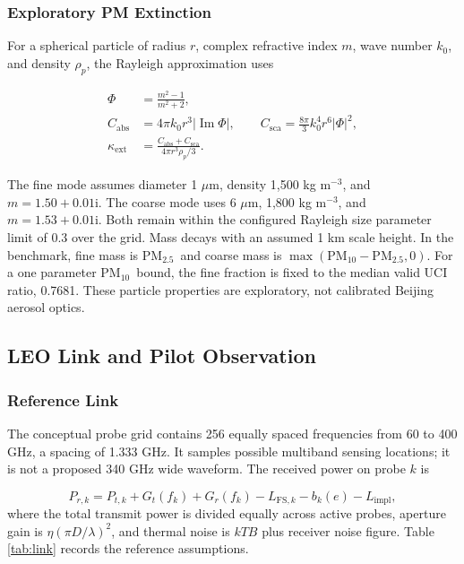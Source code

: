 \documentclass[conference]{IEEEtran}
\newcommand{\pmfive}{PM$_{2.5}$}
\newcommand{\pmten}{PM$_{10}$}
\begin{document}
\subsubsection{Exploratory PM Extinction}

For a spherical particle of radius $r$, complex refractive index $m$, wave number $k_0$, and density $\rho_p$, the Rayleigh approximation uses \cite{bohren1983}

\begin{align}
\Phi &= \frac{m^2-1}{m^2+2}, \\
C_{\mathrm{abs}} &=4\pi k_0 r^3|\operatorname{Im}\Phi|,\qquad
C_{\mathrm{sca}}=\frac{8\pi}{3}k_0^4r^6|\Phi|^2,\\
\kappa_{\mathrm{ext}}&=\frac{C_{\mathrm{abs}}+C_{\mathrm{sca}}}
{4\pi r^3\rho_p/3}.
\label{eq:pm}
\end{align}

The fine mode assumes diameter 1 $\mu$m, density 1,500 kg m$^{-3}$, and $m=1.50+0.01\mathrm{i}$. The coarse mode uses 6 $\mu$m, 1,800 kg m$^{-3}$, and $m=1.53+0.01\mathrm{i}$. Both remain within the configured Rayleigh size parameter limit of 0.3 over the grid. Mass decays with an assumed 1 km scale height. In the benchmark, fine mass is \pmfive\ and coarse mass is $\max(\mathrm{PM}_{10}-\mathrm{PM}_{2.5},0)$. For a one parameter \pmten\ bound, the fine fraction is fixed to the median valid UCI ratio, 0.7681. These particle properties are exploratory, not calibrated Beijing aerosol optics.

\subsection{LEO Link and Pilot Observation}

\subsubsection{Reference Link}

The conceptual probe grid contains 256 equally spaced frequencies from 60 to 400 GHz, a spacing of 1.333 GHz. It samples possible multiband sensing locations; it is not a proposed 340 GHz wide waveform. The received power on probe $k$ is

\begin{equation}
P_{r,k}=P_{t,k}+G_t(f_k)+G_r(f_k)-L_{\mathrm{FS},k}
-b_k(e)-L_{\mathrm{impl}},
\label{eq:link}
\end{equation}
where the total transmit power is divided equally across active probes, aperture gain is $\eta(\pi D/\lambda)^2$, and thermal noise is $kTB$ plus receiver noise figure. Table \ref{tab:link} records the reference assumptions.
\end{document}
